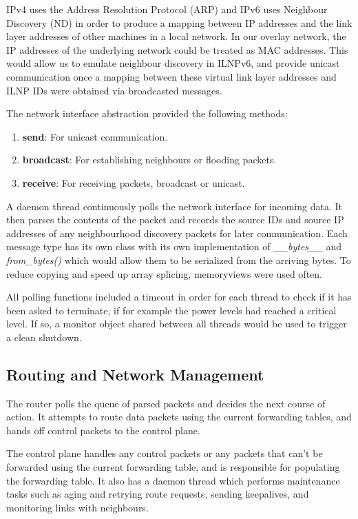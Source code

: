 \documentclass[12pt]{article}
\begin{document}
IPv4 uses the Address Resolution Protocol (ARP) and IPv6 uses Neighbour Discovery (ND) in order to produce a mapping between IP addresses and the link layer addresses of other machines in a local network. In our overlay network, the IP addresses of the underlying network could be treated as MAC addresses. This would allow us to emulate neighbour discovery in ILNPv6, and provide unicast communication once a mapping between these virtual link layer addresses and ILNP IDs were obtained via broadcasted messages. 

The network interface abstraction provided the following methods:
\begin{enumerate}
	\item \textbf{send}: For unicast communication.
	\item \textbf{broadcast}: For establishing neighbours or flooding packets.
	\item \textbf{receive}: For receiving packets, broadcast or unicast.
\end{enumerate}

A daemon thread continuously polls the network interface for incoming data. It then parses the contents of the packet and records the source IDs and source IP addresses of any neighbourhood discovery packets for later communication. Each message type has its own class with its own implementation of \emph{\_\_bytes\_\_} and \emph{from\_bytes()} which would allow them to be serialized from the arriving bytes. To reduce copying and speed up array splicing, memoryviews were used often.

All polling functions included a timeout in order for each thread to check if it has been asked to terminate, if for example the power levels had reached a critical level. If so, a monitor object shared between all threads would be used to trigger a clean shutdown.

\subsection{Routing and Network Management}

The router polls the queue of parsed packets and decides the next course of action. It attempts to route data packets using the current forwarding tables, and hands off control packets to the control plane. 

The control plane handles any control packets or any packets that can't be forwarded using the current forwarding table, and is responsible for populating the forwarding table. It also has a daemon thread which performs maintenance tasks such as aging and retrying route requests, sending keepalives, and monitoring links with neighbours.
\end{document}
